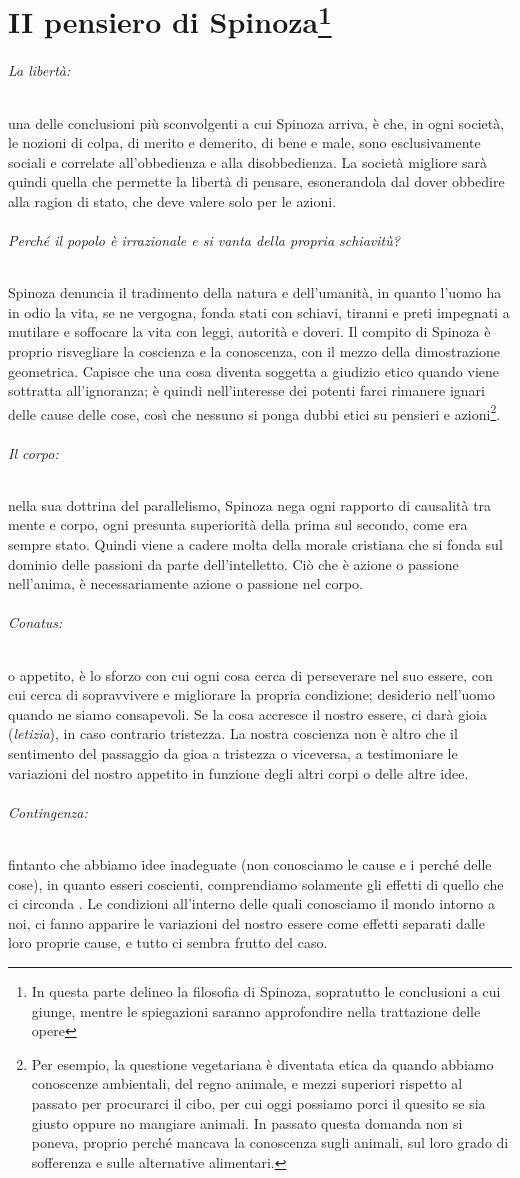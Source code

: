 \chapter*{II pensiero di Spinoza\footnote{In questa parte delineo la filosofia di Spinoza, sopratutto le conclusioni a cui giunge, mentre le spiegazioni saranno approfondire nella trattazione delle opere}}
\subparagraph{La libertà:} una delle conclusioni più sconvolgenti a cui Spinoza arriva, è che, in ogni società, le nozioni di colpa, di merito e demerito, di bene e male, sono esclusivamente sociali e correlate all'obbedienza e alla disobbedienza. La società migliore sarà quindi quella che permette la libertà di pensare, esonerandola dal dover obbedire alla ragion di stato, che deve valere solo per le azioni.
\subparagraph{Perché il popolo è irrazionale e si vanta della propria schiavitù?} Spinoza denuncia il tradimento della natura e dell'umanità, in quanto l'uomo ha in odio la vita, se ne vergogna, fonda stati con schiavi, tiranni e preti impegnati a mutilare e soffocare la vita con leggi, autorità e doveri. Il compito di Spinoza è proprio risvegliare la coscienza e la conoscenza, con il mezzo della dimostrazione geometrica. Capisce che una cosa diventa soggetta a giudizio etico quando viene sottratta all'ignoranza; è quindi nell'interesse dei potenti farci rimanere ignari delle cause delle cose, così che nessuno si ponga dubbi etici su pensieri e azioni\footnote{Per esempio, la questione vegetariana è diventata etica da quando abbiamo conoscenze ambientali, del regno animale, e mezzi superiori rispetto al passato per procurarci il cibo, per cui oggi possiamo porci il quesito se sia giusto oppure no mangiare animali. In passato questa domanda non si poneva, proprio perché mancava la conoscenza sugli animali, sul loro grado di sofferenza e sulle alternative alimentari.}.
\subparagraph{Il corpo:} nella sua dottrina del parallelismo, Spinoza nega ogni rapporto di causalità tra mente e corpo, ogni presunta superiorità della prima sul secondo, come era sempre stato. Quindi viene a cadere molta della morale cristiana che si fonda sul dominio delle passioni da parte dell'intelletto. Ciò che è azione o passione nell'anima, è necessariamente azione o passione nel corpo.
\subparagraph{Conatus:} o appetito, è lo sforzo con cui ogni cosa cerca di perseverare nel suo essere, con cui cerca di sopravvivere e migliorare la propria condizione; desiderio nell'uomo quando ne siamo consapevoli. Se la cosa accresce il nostro essere, ci darà gioia (\textit{letizia}), in caso contrario tristezza. La nostra coscienza non è altro che il sentimento del passaggio da gioa a tristezza o viceversa, a testimoniare le variazioni del nostro appetito in funzione degli altri corpi o delle altre idee.
\subparagraph{Contingenza:}fintanto che abbiamo idee inadeguate (non conosciamo le cause e i perché delle cose), in quanto esseri coscienti, comprendiamo solamente gli effetti di quello che ci circonda . Le condizioni all'interno delle quali conosciamo il mondo intorno a noi, ci fanno apparire le variazioni del nostro essere come effetti separati dalle loro proprie cause, e tutto ci sembra frutto del caso.

